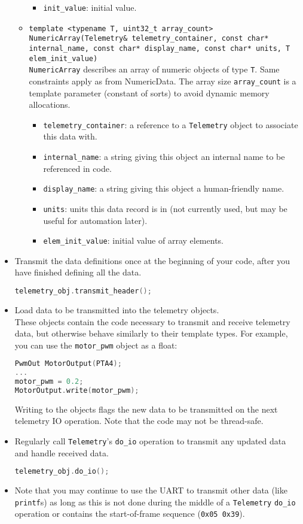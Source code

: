 \documentclass[11pt]{article}
\begin{document}
\begin{itemize}
\begin{itemize}
\begin{itemize}
      \item \texttt{init\_value}: initial value.
    \end{itemize}
    \item \texttt{template <typename T, uint32\_t array\_count>\\ NumericArray(Telemetry\& telemetry\_container, const char* internal\_name, const char* display\_name, const char* units, T elem\_init\_value)} \\
    \texttt{NumericArray} describes an array of numeric objects of type \texttt{T}. Same constraints apply as from NumericData. The array size \texttt{array\_count} is a template parameter (constant of sorts) to avoid dynamic memory allocations.
    \begin{itemize}
      \item \texttt{telemetry\_container}: a reference to a \texttt{Telemetry} object to associate this data with.
      \item \texttt{internal\_name}: a string giving this object an internal name to be referenced in code.
      \item \texttt{display\_name}: a string giving this object a human-friendly name.
      \item \texttt{units}: units this data record is in (not currently used, but may be useful for automation later).
      \item \texttt{elem\_init\_value}: initial value of array elements.
    \end{itemize}
  \end{itemize}
  \item Transmit the data definitions once at the beginning of your code, after you have finished defining all the data.
  \begin{lstlisting}[language=C++]
telemetry_obj.transmit_header();
  \end{lstlisting}
  \item Load data to be transmitted into the telemetry objects. \\
  These objects contain the code necessary to transmit and receive telemetry data, but otherwise behave similarly to their template types. For example, you can use the \texttt{motor\_pwm} object as a float:
  \begin{lstlisting}[language=C++]
PwmOut MotorOutput(PTA4);
...
motor_pwm = 0.2;
MotorOutput.write(motor_pwm);
  \end{lstlisting}
  Writing to the objects flags the new data to be transmitted on the next telemetry IO operation. Note that the code may not be thread-safe.
  \item Regularly call \texttt{Telemetry}'s \texttt{do\_io} operation to transmit any updated data and handle received data.
  \begin{lstlisting}[language=C++]
telemetry_obj.do_io();
  \end{lstlisting}
  \item Note that you may continue to use the UART to transmit other data (like \texttt{printf}s) as long as this is not done during the middle of a \texttt{Telemetry} \texttt{do\_io} operation or contains the start-of-frame sequence (\texttt{0x05 0x39}).
\end{itemize}
\end{document}

